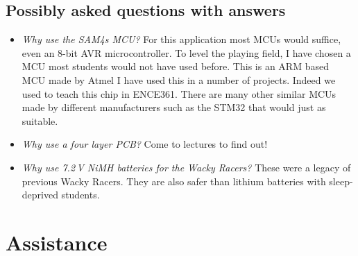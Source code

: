 \documentclass[11pt, a4paper]{article}
\begin{document}
\subsection{Possibly asked questions with answers}

\begin{itemize}
\item \emph{Why use the SAM4s MCU?}  For this application most MCUs
  would suffice, even an 8-bit AVR microcontroller.  To level the
  playing field, I have chosen a MCU most students would not have used
  before.  This is an ARM based MCU made by Atmel I have used this in
  a number of projects.  Indeed we used to teach this chip in ENCE361.
  There are many other similar MCUs made by different manufacturers
  such as the STM32 that would just as suitable.

\item \emph{Why use a four layer PCB?}  Come to lectures to find out!

\item \emph{Why use 7.2\,V NiMH batteries for the Wacky Racers?}
  These were a legacy of previous Wacky Racers.  They are also safer
  than lithium batteries with sleep-deprived students.


\end{itemize}


\section{Assistance}
\end{document}
